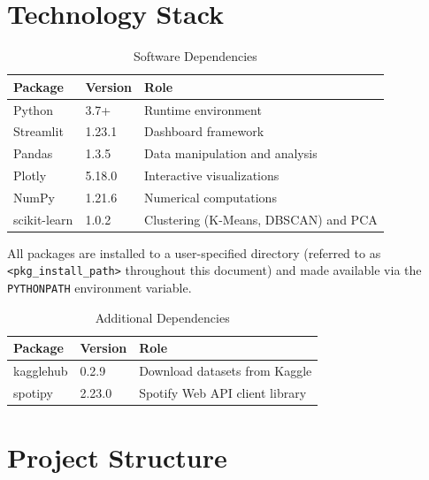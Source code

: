 \documentclass[12pt,a4paper]{article}
\begin{document}
\section{Technology Stack}

\begin{table}[H]
\centering
\caption{Software Dependencies}
\begin{tabular}{@{}lll@{}}
\toprule
\textbf{Package} & \textbf{Version} & \textbf{Role} \\
\midrule
Python        & 3.7+    & Runtime environment \\
Streamlit     & 1.23.1  & Dashboard framework \\
Pandas        & 1.3.5   & Data manipulation and analysis \\
Plotly        & 5.18.0  & Interactive visualizations \\
NumPy         & 1.21.6  & Numerical computations \\
scikit-learn  & 1.0.2   & Clustering (K-Means, DBSCAN) and PCA \\
\bottomrule
\end{tabular}
\end{table}

All packages are installed to a user-specified directory (referred to as \texttt{<pkg\_install\_path>} throughout this document) and made available via the \texttt{PYTHONPATH} environment variable.

\begin{table}[H]
\centering
\caption{Additional Dependencies}
\begin{tabular}{@{}lll@{}}
\toprule
\textbf{Package} & \textbf{Version} & \textbf{Role} \\
\midrule
kagglehub & 0.2.9 & Download datasets from Kaggle \\
spotipy   & 2.23.0 & Spotify Web API client library \\
\bottomrule
\end{tabular}
\end{table}

\section{Project Structure}
\end{document}
